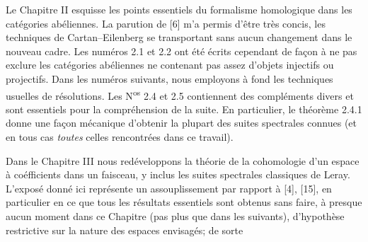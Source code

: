 Le Chapitre II esquisse les points essentiels du formalisme homologique dans
les catégories abéliennes. La parution de [6] m'a permis d'être très concis,
les techniques de Cartan--Eilenberg se transportant sans aucun changement dans
le nouveau cadre. Les numéros 2.1 et 2.2 ont été écrits cependant de façon à ne
pas exclure les catégories abéliennes ne contenant pas assez d'objets injectifs
ou projectifs. Dans les numéros suivants, nous employons à fond les techniques
usuelles de résolutions. Les N\textsuperscript{os} 2.4 et 2.5 contiennent des
compléments divers et sont essentiels pour la compréhension de la suite. En
particulier, le théorème 2.4.1 donne une façon mécanique d'obtenir la plupart
des suites spectrales connues (et en tous cas \emph{toutes} celles rencontrées
dans ce travail).

Dans le Chapitre III nous redéveloppons la théorie de la cohomologie d'un
espace à coéfficients dans un faisceau, y inclus les suites spectrales
classiques de Leray. L'exposé donné ici représente un assouplissement par
rapport à [4], [15], en particulier en ce que tous les résultats essentiels
sont obtenus sans faire, à presque aucun moment dans ce Chapitre (pas plus que
dans les suivants), d'hypothèse restrictive sur la nature des espaces
envisagés; de sorte



